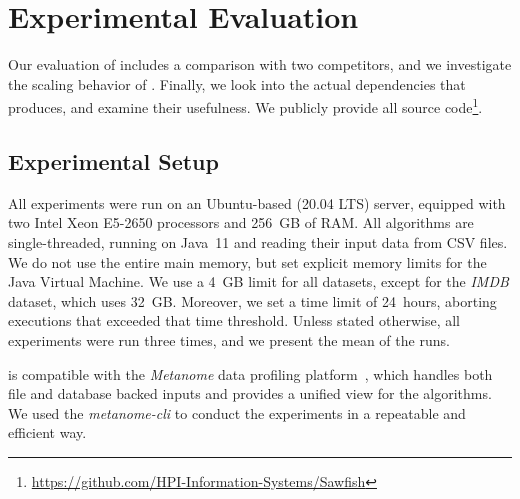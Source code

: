 \section{Experimental Evaluation}
\label{section:evaluation}
Our evaluation of \sawfish includes a comparison with two competitors, and we investigate the scaling behavior of \sawfish.
Finally, we look into the actual dependencies that \sawfish produces, and examine their usefulness. We publicly provide all source code\footnote{\url{https://github.com/HPI-Information-Systems/Sawfish}}.

\subsection{Experimental Setup}
All experiments were run on an Ubuntu-based (20.04 LTS) server, equipped with two Intel Xeon E5-2650 processors and 256~GB of RAM\@.
All algorithms are single-threaded, running on Java~11 and reading their input data from CSV files.
We do not use the entire main memory, but set explicit memory limits for the Java Virtual Machine.
We use a 4~GB limit for all datasets, except for the \emph{IMDB} dataset, which uses 32~GB.
Moreover, we set a time limit of 24~hours, aborting executions that exceeded that time threshold. 
Unless stated otherwise, all experiments were run three times, and we present the mean of the runs.

\sawfish is compatible with the \emph{Metanome} data profiling platform~\cite{papenbrock2015metanome},
which handles both file and database backed inputs and provides a unified view for the algorithms.
We used the \emph{metanome-cli} to conduct the experiments in a repeatable and efficient way. %


